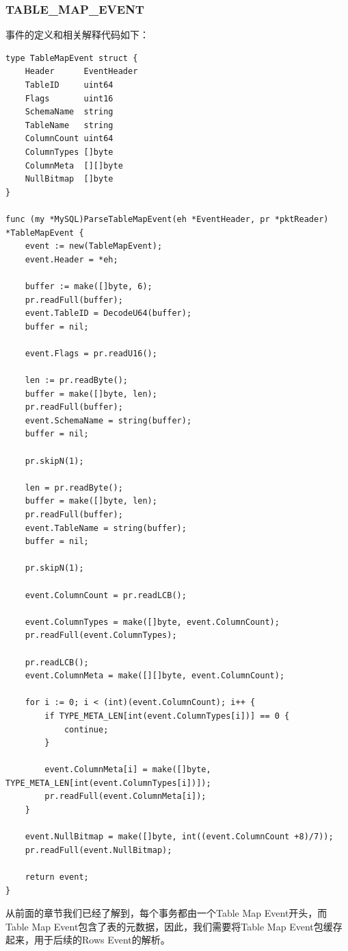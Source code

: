 \documentclass[a4paper, titlepage, 10pt, bookmark]{article}
\begin{document}
\subsubsection{TABLE\_MAP\_EVENT}
事件的定义和相关解释代码如下：
\begin{spacing}{1.0}
\begin{lstlisting}
type TableMapEvent struct {
    Header      EventHeader
    TableID     uint64
    Flags       uint16
    SchemaName  string
    TableName   string
    ColumnCount uint64
    ColumnTypes []byte
    ColumnMeta  [][]byte
    NullBitmap  []byte
}

func (my *MySQL)ParseTableMapEvent(eh *EventHeader, pr *pktReader) *TableMapEvent {
    event := new(TableMapEvent);
    event.Header = *eh;

    buffer := make([]byte, 6);
    pr.readFull(buffer);
    event.TableID = DecodeU64(buffer);
    buffer = nil;

    event.Flags = pr.readU16();

    len := pr.readByte();
    buffer = make([]byte, len);
    pr.readFull(buffer);
    event.SchemaName = string(buffer);
    buffer = nil;

    pr.skipN(1);

    len = pr.readByte();
    buffer = make([]byte, len);
    pr.readFull(buffer);
    event.TableName = string(buffer);
    buffer = nil;

    pr.skipN(1);

    event.ColumnCount = pr.readLCB();

    event.ColumnTypes = make([]byte, event.ColumnCount);
    pr.readFull(event.ColumnTypes);

    pr.readLCB();
    event.ColumnMeta = make([][]byte, event.ColumnCount);

    for i := 0; i < (int)(event.ColumnCount); i++ {
        if TYPE_META_LEN[int(event.ColumnTypes[i])] == 0 { 
            continue; 
        }
        
        event.ColumnMeta[i] = make([]byte, TYPE_META_LEN[int(event.ColumnTypes[i])]);
        pr.readFull(event.ColumnMeta[i]);
    }

    event.NullBitmap = make([]byte, int((event.ColumnCount +8)/7));
    pr.readFull(event.NullBitmap);

    return event;
}
\end{lstlisting}
\end{spacing}

从前面的章节我们已经了解到，每个事务都由一个Table Map Event开头，而Table Map Event包含了表的元数据，因此，我们需要将Table Map Event包缓存起来，用于后续的Rows Event的解析。
\end{document}
